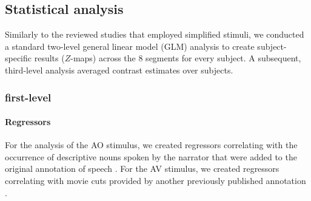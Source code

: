 \documentclass[english]{article}
\begin{document}
\subsection{Statistical analysis}

Similarly to the reviewed studies that employed simplified stimuli, we conducted
a standard two-level general linear model (GLM) analysis to create
subject-specific results ($Z$-maps) across the 8 segments for every subject. A
subsequent, third-level analysis averaged contrast estimates over subjects.


\subsubsection{first-level}

\paragraph{Regressors}


For the analysis of the AO stimulus, we created regressors correlating with the
occurrence of descriptive nouns spoken by the narrator that were added to the
original annotation of speech \citep{haeusler2020speechanno}.
For the AV stimulus, we created regressors correlating with movie cuts provided
by another previously published annotation \citep{haeusler2016cutanno}.
\end{document}

